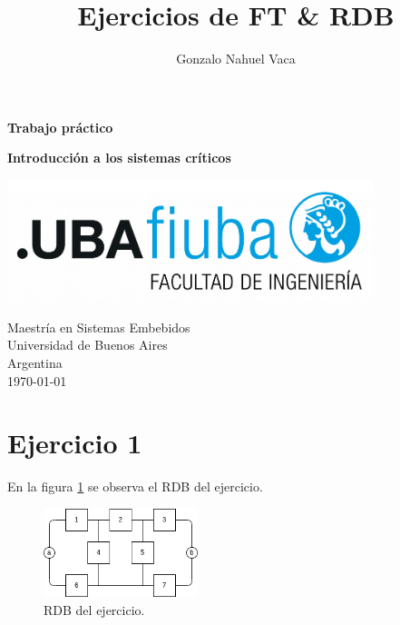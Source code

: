 \documentclass[
    11pt,
    spanish,
    a4paper
]{article}
\title{Ejercicios de FT \& RDB}
\author{Gonzalo Nahuel Vaca}
\def\doctype{Trabajo práctico}
\begin{document}
\makeatletter
\begin{titlepage}
	\begin{center}
		\vspace*{1cm}

		\Huge
		\textbf{\doctype}
		\vspace{0.5cm}

		\LARGE
		\@title
		\vspace{0.5cm}

		\textbf{Introducción a los sistemas críticos}

		\vspace{1.5cm}

		\textbf{\@author}

		\vspace{1.5cm}

		\includegraphics[width=0.8\textwidth]{img/logoFIUBA.pdf}

		\vfill
		Maestría en Sistemas Embebidos\\
		Universidad de Buenos Aires\\
		Argentina\\
		\today
	\end{center}
\end{titlepage}
\makeatother
\newpage

\section{Ejercicio 1}

En la figura \ref{fig:rdboriginal} se observa el RDB del ejercicio.

\begin{figure}[htbp]
	\centering
	\includegraphics[width=0.4\textwidth]{img/rdb.png}
	\caption{RDB del ejercicio.}
	\label{fig:rdboriginal}
\end{figure}
\end{document}
